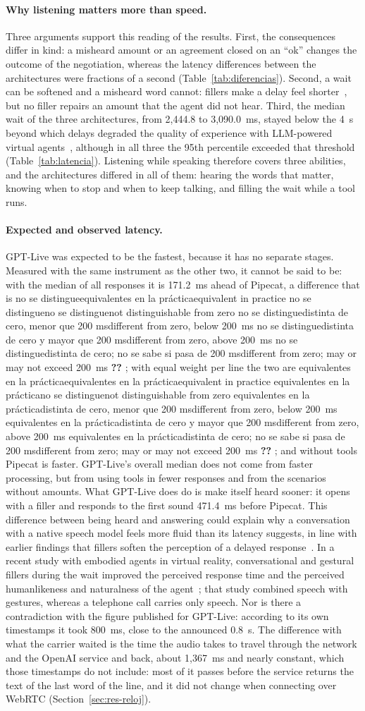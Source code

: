 \documentclass[11pt]{article}
\makeatletter
\newcommand{\RDifAbsUnoTres}{171.2}
\newcommand{\RDifVeredictoUnoTres}{no se distingue}
\newcommand{\RLineaDifVeredictoUnoTres}{equivalentes en la práctica}
\newcommand{\RObsMedB}{3{,}090.0}
\newcommand{\RObsMedC}{2{,}444.8}
\newcommand{\RPrimerDifUnoTresIc}{471.4}
\newcommand{\RRelojModeloMed}{800}
\newcommand{\RRelojServicioMed}{1{,}367}
\newcommand{\ver@eq}{equivalentes en la práctica}
\newcommand{\ver@nd}{no se distingue}
\newcommand{\ver@menor}{distinta de cero, menor que 200 ms}
\newcommand{\ver@mayor}{distinta de cero y mayor que 200 ms}
\newcommand{\ver@cruza}{distinta de cero; no se sabe si pasa de 200 ms}
\newcommand{\verdict}[1]{%
  \ifx#1\ver@eq equivalent in practice%
  \else\ifx#1\ver@nd not distinguishable from zero%
  \else\ifx#1\ver@menor different from zero, below 200~ms%
  \else\ifx#1\ver@mayor different from zero, above 200~ms%
  \else\ifx#1\ver@cruza different from zero; may or may not exceed 200~ms%
  \else\textbf{??}\PackageWarning{paper}{Unknown verdict}%
  \fi\fi\fi\fi\fi}
\makeatother
\begin{document}
\paragraph{Why listening matters more than speed.} Three arguments support this reading of the results.
First, the consequences differ in kind: a misheard amount or an agreement closed on an ``ok'' changes the outcome of the negotiation, whereas the latency differences between the architectures were fractions of a second (Table~\ref{tab:diferencias}).
Second, a wait can be softened and a misheard word cannot: fillers make a delay feel shorter~\cite{shiwa2009,maslych2025,gonzales2025}, but no filler repairs an amount that the agent did not hear.
Third, the median wait of the three architectures, from \RObsMedC{} to \RObsMedB~ms, stayed below the 4~s beyond which delays degraded the quality of experience with LLM-powered virtual agents~\cite{maslych2025}, although in all three the 95th percentile exceeded that threshold (Table~\ref{tab:latencia}).
Listening while speaking therefore covers three abilities, and the architectures differed in all of them: hearing the words that matter, knowing when to stop and when to keep talking, and filling the wait while a tool runs.


\paragraph{Expected and observed latency.} GPT-Live was expected to be the
fastest, because it has no separate stages. Measured with the same instrument as the
other two, it cannot be said to be: with the median of all responses it is
\RDifAbsUnoTres~ms ahead of Pipecat, a difference that is
\verdict{\RDifVeredictoUnoTres}; with equal weight per line the two are
\verdict{\RLineaDifVeredictoUnoTres}; and without tools Pipecat is faster. GPT-Live's
overall median does not come from faster processing, but from using tools in fewer
responses and from the scenarios without amounts. What GPT-Live does do is make itself
heard sooner: it opens with a filler and responds to the first sound
\RPrimerDifUnoTresIc~ms before Pipecat. This difference between being heard and
answering could explain why a conversation with a native speech model feels more fluid
than its latency suggests, in line with earlier findings that fillers soften the perception of a delayed response~\cite{shiwa2009,maslych2025}.
In a recent study with embodied agents in virtual reality, conversational and gestural fillers during the wait improved the perceived response time and the perceived humanlikeness and naturalness of the agent~\cite{gonzales2025}; that study combined speech with gestures, whereas a telephone call carries only speech.
Nor is there a contradiction with the figure published for
GPT-Live: according to its own timestamps it took \RRelojModeloMed~ms, close to the
announced 0.8~s. The difference with what the carrier waited is the time the audio
takes to travel through the network and the OpenAI service and back, about
\RRelojServicioMed~ms and nearly constant, which those timestamps do not include: most
of it passes before the service returns the text of the last word of the line, and it
did not change when connecting over WebRTC (Section~\ref{sec:res-reloj}).
\end{document}
